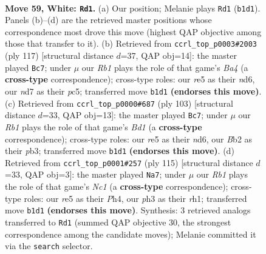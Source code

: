 \documentclass[11pt]{article}
\begin{document}
\clearpage

\begin{figure}[p]\centering
\begin{subfigure}{0.46\textwidth}\centering
\resizebox{\linewidth}{!}{%
\newchessgame
\chessboard[
  setfen={6k1/3n4/6P1/4r3/p1p2K2/P1P4p/1BP4P/1R6 w - - 7 59},
  showmover=false,
  pgfstyle=straightmove, color=movearrow, markmove={b1-d1}
]}
\caption{}
\end{subfigure}\hfill
\begin{subfigure}{0.46\textwidth}\centering
\resizebox{\linewidth}{!}{%
\newchessgame
\chessboard[
  setfen={8/6p1/2pNk1p1/b1P5/1p1K4/1P4P1/2r5/R7 b - - 11 59},
  showmover=false,
  pgfstyle=straightmove, color=movearrow, markmove={a5-c7}
]}
\caption{}
\end{subfigure}
\\[4pt]
\begin{subfigure}{0.46\textwidth}\centering
\resizebox{\linewidth}{!}{%
\newchessgame
\chessboard[
  setfen={3b4/3k1p1p/1p1N1p2/p2K4/P5P1/1P5P/8/8 b - - 11 52},
  showmover=false,
  pgfstyle=straightmove, color=movearrow, markmove={d8-c7}
]}
\caption{}
\end{subfigure}\hfill
\begin{subfigure}{0.46\textwidth}\centering
\resizebox{\linewidth}{!}{%
\newchessgame
\chessboard[
  setfen={2n3k1/8/3b4/P1p1pp2/K1P4p/5P2/1P6/7R b - - 4 58},
  showmover=false,
  pgfstyle=straightmove, color=movearrow, markmove={c8-a7}
]}
\caption{}
\end{subfigure}
\caption{\textbf{Move 59, White: \texttt{Rd1}.} (a) Our position; Melanie plays \texttt{Rd1} (\texttt{b1d1}). Panels (b)--(d) are the retrieved master positions whose correspondence most drove this move (highest QAP objective among those that transfer to it). (b) Retrieved from \texttt{ccrl\_top\_p0003\#2003} (ply 117) [structural distance $d$=37, QAP obj=14]: the master played \texttt{Bc7}; under $\mu$ our \emph{Rb1} plays the role of that game's \emph{Ba4} (a \textbf{cross-type} correspondence); cross-type roles: our \emph{r}e5 as their \emph{n}d6, our \emph{n}d7 as their \emph{p}c5; transferred move \texttt{b1d1} \textbf{(endorses this move)}. (c) Retrieved from \texttt{ccrl\_top\_p0000\#687} (ply 103) [structural distance $d$=33, QAP obj=13]: the master played \texttt{Bc7}; under $\mu$ our \emph{Rb1} plays the role of that game's \emph{Bd1} (a \textbf{cross-type} correspondence); cross-type roles: our \emph{r}e5 as their \emph{n}d6, our \emph{B}b2 as their \emph{p}b3; transferred move \texttt{b1d1} \textbf{(endorses this move)}. (d) Retrieved from \texttt{ccrl\_top\_p0001\#257} (ply 115) [structural distance $d$=33, QAP obj=3]: the master played \texttt{Na7}; under $\mu$ our \emph{Rb1} plays the role of that game's \emph{Nc1} (a \textbf{cross-type} correspondence); cross-type roles: our \emph{r}e5 as their \emph{P}h4, our \emph{p}h3 as their \emph{r}h1; transferred move \texttt{b1d1} \textbf{(endorses this move)}. Synthesis: 3 retrieved analogs transferred to \texttt{Rd1} (summed QAP objective 30, the strongest correspondence among the candidate moves); Melanie committed it via the \texttt{search} selector.}
\label{fig:thought-m116}
\end{figure}
\end{document}
